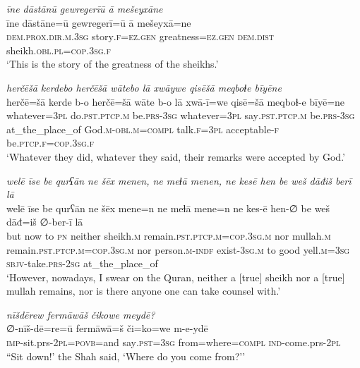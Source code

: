 \ea \label{ZB.58}
\textit{īne dāstānū gewregerīū ā mešeyxāne} \\ 
\gll īne dāstāne=ū gewregerī=ū ā mešeyxā=ne \\ 
 \textsc{dem.prox}\textsc{.dir}\textsc{.m}\textsc{.3sg} story\textsc{.f}\textsc{\textsc{=ez.gen}} greatness\textsc{\textsc{=ez.gen}} \textsc{dem.dist} sheikh\textsc{.obl}\textsc{.pl}\textsc{=cop}\textsc{.3sg}\textsc{.f} \\ 
\glt `This is the story of the greatness of the sheikhs.'
\z 
 
\ea \label{ZB.59}
\textit{herčēšā kerdebo herčēšā wātebo lā xwāywe qisēšā meqboɫe bīyēne} \\ 
\gll herčē=šā kerde b-o herčē=šā wāte b-o lā xwā-ī=we qisē=šā meqboɫ-e bīyē=ne \\ 
 whatever\textsc{=3pl} do\textsc{.pst}\textsc{.ptcp}\textsc{.m} be\textsc{.prs}\textsc{-3sg} whatever\textsc{=3pl} say\textsc{.pst}\textsc{.ptcp}\textsc{.m} be\textsc{.prs}\textsc{-3sg} at\_the\_place\_of God\textsc{.m}\textsc{-obl}\textsc{.m}\textsc{=compl} talk\textsc{.f}\textsc{=3pl} acceptable\textsc{-f} be\textsc{.ptcp}\textsc{.f}\textsc{=cop}\textsc{.3sg}\textsc{.f} \\ 
\glt `Whatever they did, whatever they said, their remarks were accepted by God.'
\z 
 
\ea \label{ZB.60}
\textit{welē īse be qurʕān ne šēx menen, ne meɫā menen, ne kesē hen be weš dāđiš berī lā} \\ 
\gll welē īse be qurʕān ne šēx mene=n ne meɫā mene=n ne kes-ē hen-∅ be weš dāđ=iš ∅-ber-ī lā \\ 
 but now to \textsc{pn} neither sheikh\textsc{.m} remain\textsc{.pst}\textsc{.ptcp}\textsc{.m}\textsc{=cop}\textsc{.3sg}\textsc{.m} nor mullah\textsc{.m} remain\textsc{.pst}\textsc{.ptcp}\textsc{.m}\textsc{=cop}\textsc{.3sg}\textsc{.m} nor person\textsc{.m}\textsc{-indf} exist\textsc{-3sg}\textsc{.m} to good yell\textsc{.m}\textsc{=3sg} \textsc{sbjv-}take\textsc{.prs}-\textsc{2sg} at\_the\_place\_of \\ 
\glt `However, nowadays, I swear on the Quran, neither a [true] sheikh nor a [true] mullah remains, nor is there anyone one can take counsel with.'
\z 
 
\ea \label{ZQ.4}
\textit{nīšdērew fermāwāš čikowe meydē?} \\ 
\gll ∅-nīš-dē=re=ū fermāwā=š či=ko=we m-e-ydē \\ 
 \textsc{imp-}sit.prs-\textsc{2pl}\textsc{=\textsc{povb}}=and say\textsc{.pst}\textsc{=3sg} from=where\textsc{=compl} \textsc{ind-}come.prs-\textsc{2pl} \\ 
\glt ``Sit down!' the Shah said, ‘Where do you come from?’'
\z 
 
